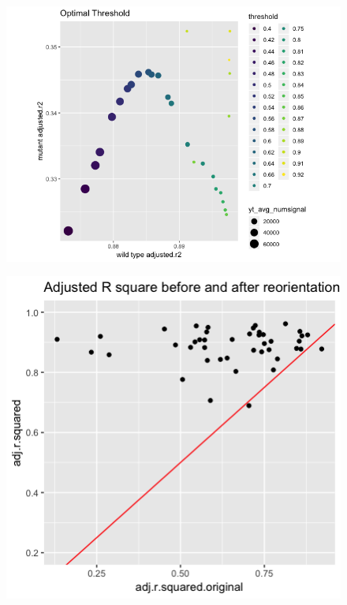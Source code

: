 \documentclass[10pt,letterpaper]{article}
\begin{document}
\begin{figure}[H]
\includegraphics[width=0.9\linewidth]{visualization_paper/optimal_threshold2} \end{figure}

\begin{figure}[H]
\includegraphics[width=0.8\linewidth]{visualization_paper/adj_r2_before_after_wt} \end{figure}
\end{document}
